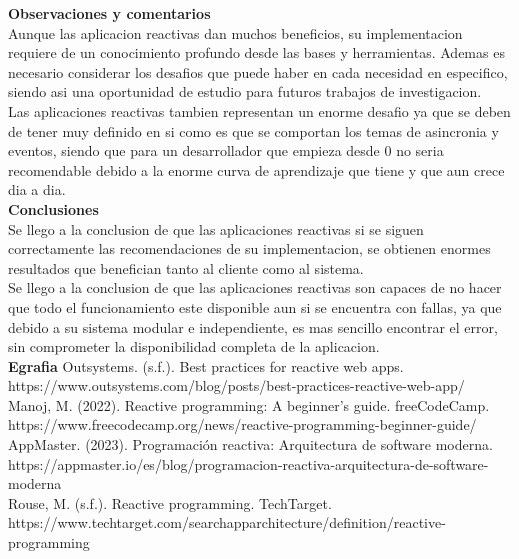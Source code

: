 \documentclass[12pt]{article}
\begin{document}
\noindent\textbf{Observaciones y comentarios} \\
Aunque las aplicacion reactivas dan muchos beneficios, su implementacion requiere de un conocimiento profundo desde las bases y herramientas. Ademas es necesario considerar los desafios que puede haber en cada necesidad en especifico, siendo asi una oportunidad de estudio para futuros trabajos de investigacion. 
\vspace{1em}
\\ Las aplicaciones reactivas tambien representan un enorme desafio ya que se deben de tener muy definido en si como es que se comportan los temas de asincronia y eventos, siendo que para un desarrollador que empieza desde 0 no seria recomendable debido a la enorme curva de aprendizaje que tiene y que aun crece dia a dia.
\vspace{1em} \\
\noindent\textbf{Conclusiones} \\
Se llego a la conclusion de que las aplicaciones reactivas si se siguen correctamente las recomendaciones de su implementacion, se obtienen enormes resultados que benefician tanto al cliente como al sistema.
\vspace{1em}
\\ Se llego a la conclusion de que las aplicaciones reactivas son capaces de no hacer que todo el funcionamiento este disponible aun si se encuentra con fallas, ya que debido a su sistema modular e independiente, es mas sencillo encontrar el error, sin comprometer la disponibilidad completa de la aplicacion. \\


\noindent\textbf{Egrafia}
Outsystems. (s.f.). Best practices for reactive web apps. https://www.outsystems.com/blog/posts/best-practices-reactive-web-app/ \\

Manoj, M. (2022). Reactive programming: A beginner's guide. freeCodeCamp. https://www.freecodecamp.org/news/reactive-programming-beginner-guide/ \\

AppMaster. (2023). Programación reactiva: Arquitectura de software moderna. https://appmaster.io/es/blog/programacion-reactiva-arquitectura-de-software-moderna \\

Rouse, M. (s.f.). Reactive programming. TechTarget. https://www.techtarget.com/searchapparchitecture/definition/reactive-programming
\end{document}
